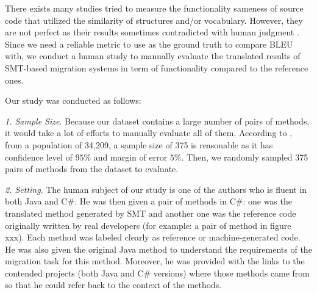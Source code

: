 There exists many studies tried to measure the functionality sameness of source code that utilized the similarity of structures and/or vocabulary. However, they are not perfect as their results sometimes contradicted with human judgment \cite{fse14-higo}. Since we need a reliable metric to use as the ground truth to compare BLEU with, we conduct a human study to manually evaluate the translated results of SMT-based migration systems in term of functionality compared to the reference ones.

Our study was conducted as follows:

\emph{1. Sample Size}. Because our dataset contains a large number of pairs of methods, it would take a lot of efforts to manually evaluate all of them. According to \cite{website}, from a population of 34,209, a sample size of 375 is reasonable as it has confidence level of $95\%$ and margin of error $5\%$. Then, we randomly sampled 375 pairs of methods from the dataset to evaluate. 

\emph{2. Setting}. The human subject of our study is one of the authors who is fluent in both Java and C\#. He was then given a pair of methods in C\#: one was the translated method generated by SMT and another one was the reference code originally written by real developers (for example: a pair of method in figure xxx). Each method was labeled clearly as reference or machine-generated code. He was also given the original Java method to understand the requirements of the migration task for this method. Moreover, he was provided with the links to the contended projects (both Java and C\# versions) where those methods came from so that he could refer back to the context of the methods.

